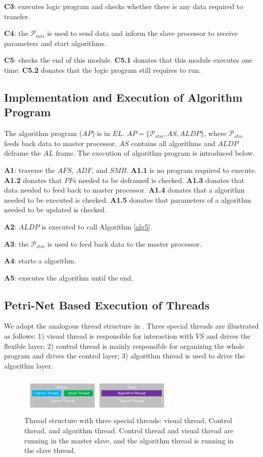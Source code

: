 \documentclass[journal,UTF8]{IEEEtran}
\begin{document}
\textbf{C3}: executes logic program and checks whether there is any data required to transfer.  

\textbf{C4}: the $\mathcal{P}_{mts}$ is used to send data and inform the slave processor to receive parameters and start algorithms.   

\textbf{C5}: checks the end of this module. \textbf{C5.1} donates that this module executes one time. \textbf{C5.2} donates that the logic program still requires to run.  

\subsection{Implementation and Execution of Algorithm Program }
The algorithm program ($AP$) is in $EL$. $AP=\{\mathcal{P}_{stm}, AS, ALDP\}$, where $\mathcal{P}_{stm}$ feeds back data to master processor, $AS$ contains all algorithms and $ALDP$ deframe the $AL$ frame. The execution of algorithm program is introduced below.

\textbf{A1}: traverse the $AFS$, $ADF$, and $SMB$. \textbf{A1.1} is no program required to execute. \textbf{A1.2} donates that $PF$s needed to be deframed is checked. \textbf{A1.3} donates that data needed to feed back to master processor. \textbf{A1.4} donates that a algorithm needed to be executed is checked. \textbf{A1.5} donates that parameters of a algorithm needed to be updated is checked.  

\textbf{A2}: $ALDP$ is executed to call Algorithm \ref{alg5}. 

\textbf{A3}: the $\mathcal{P}_{stm}$ is used to feed back data to the master processor. 

\textbf{A4}: starts a algorithm.

\textbf{A5}: executes the algorithm until the end. 

\subsection{Petri-Net Based Execution of Threads}
We adopt the analogous thread structure in \cite{wu2018customized}. Three special threads are illustrated as follows: 1) visual thread is responsible for interaction with $VS$ and drives the flexible layer; 2) control thread is mainly responsible for organizing the whole program and drives the control layer; 3) algorithm thread is used to drive the algorithm layer.

\begin{figure}
	\centering
	\includegraphics[width=3in]{fig/Threads.pdf}
	\caption{ Thread structure with three special threads: visual thread, Control thread, and algorithm thread. Control thread and visual thread are running in the master slave, and the algorithm thread is running in the slave thread.}
	\label{fig:Threads}
\end{figure}
\end{document}
